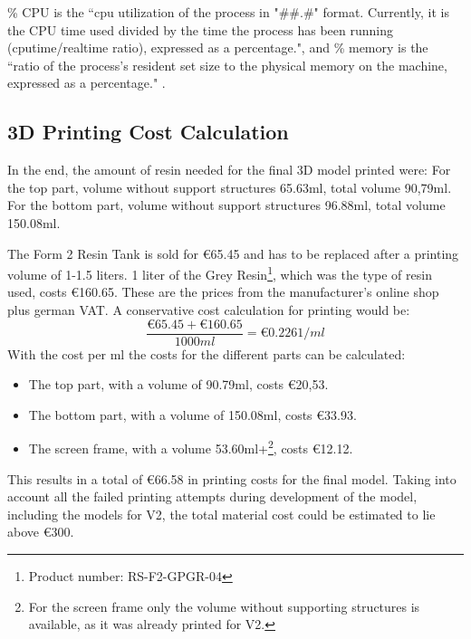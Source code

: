 \documentclass[12pt]{article}
\begin{document}
\% CPU is the ``cpu utilization of the process in "\#\#.\#" format.
Currently, it is the CPU time used divided by the time the process has been running (cputime/realtime ratio),
expressed as a percentage.", and 
\% memory is the ``ratio of the process's resident set size  to the
                             physical memory on the machine, expressed as a
                             percentage." \cite{MAN:ps}.


\subsection{3D Printing Cost Calculation}
In the end, the amount of resin needed for the final 3D model printed were:
For the top part, volume without support structures 65.63ml, total volume 90,79ml.
For the bottom part, volume without support structures 96.88ml, total volume 150.08ml.

The Form 2 Resin Tank is sold for €65.45 and has to be replaced after a printing volume of 1-1.5 liters.
1 liter of the Grey Resin\footnote{Product number: RS-F2-GPGR-04}, which was the type of resin used, costs €160.65.
These are the prices from the manufacturer's online shop plus german VAT.
A conservative cost calculation for printing would be:
\[\frac{\text{€}65.45 + \text{€}160.65}{1000 ml} = \text{€}0.2261/ml\]
With the cost per ml the costs for the different parts can be calculated:
\begin{itemize}
  \item The top part, with a volume of 90.79ml, costs €20,53.
  \item The bottom part, with a volume of 150.08ml, costs €33.93.
  \item The screen frame, with a volume 53.60ml+\footnote{For the screen frame only the volume without supporting structures is available, as it was already printed for V2.}, costs €12.12.
\end{itemize}
This results in a total of €66.58 in printing costs for the final model.
Taking into account all the failed printing attempts during development of the model,
including the models for V2, the total material cost could be estimated to lie above €300.
\end{document}
